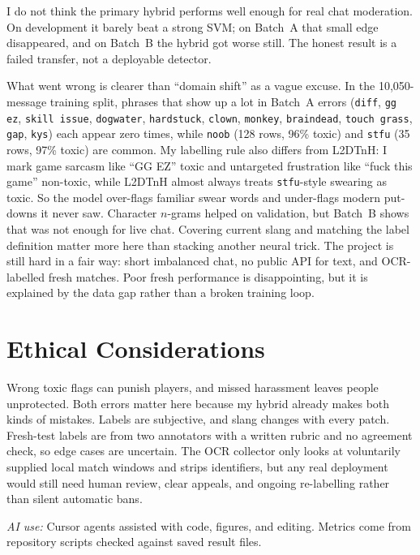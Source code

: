 I do not think the primary hybrid performs well enough for real chat moderation. On development it barely beat a strong SVM; on Batch~A that small edge disappeared, and on Batch~B the hybrid got worse still. The honest result is a failed transfer, not a deployable detector.

What went wrong is clearer than ``domain shift'' as a vague excuse. In the 10,050-message training split, phrases that show up a lot in Batch~A errors (\texttt{diff}, \texttt{gg ez}, \texttt{skill issue}, \texttt{dogwater}, \texttt{hardstuck}, \texttt{clown}, \texttt{monkey}, \texttt{braindead}, \texttt{touch grass}, \texttt{gap}, \texttt{kys}) each appear zero times, while \texttt{noob} (128 rows, 96\% toxic) and \texttt{stfu} (35 rows, 97\% toxic) are common. My labelling rule also differs from L2DTnH: I mark game sarcasm like ``GG EZ'' toxic and untargeted frustration like ``fuck this game'' non-toxic, while L2DTnH almost always treats \texttt{stfu}-style swearing as toxic. So the model over-flags familiar swear words and under-flags modern put-downs it never saw. Character $n$-grams helped on validation, but Batch~B shows that was not enough for live chat. Covering current slang and matching the label definition matter more here than stacking another neural trick. The project is still hard in a fair way: short imbalanced chat, no public API for text, and OCR-labelled fresh matches. Poor fresh performance is disappointing, but it is explained by the data gap rather than a broken training loop.

\section*{Ethical Considerations}

Wrong toxic flags can punish players, and missed harassment leaves people unprotected. Both errors matter here because my hybrid already makes both kinds of mistakes. Labels are subjective, and slang changes with every patch. Fresh-test labels are from two annotators with a written rubric and no agreement check, so edge cases are uncertain. The OCR collector only looks at voluntarily supplied local match windows and strips identifiers, but any real deployment would still need human review, clear appeals, and ongoing re-labelling rather than silent automatic bans.

{\small\noindent\textit{AI use:} Cursor agents assisted with code, figures, and editing. Metrics come from repository scripts checked against saved result files.}

